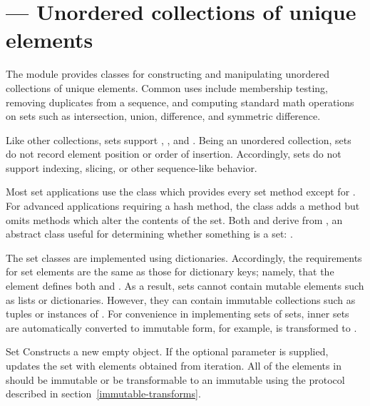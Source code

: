 \section{ ---
         Unordered collections of unique elements}



The  module provides classes for constructing and manipulating
unordered collections of unique elements.  Common uses include membership
testing, removing duplicates from a sequence, and computing standard math
operations on sets such as intersection, union, difference, and symmetric
difference.

Like other collections, sets support ,
, and .  Being an
unordered collection, sets do not record element position or order of
insertion.  Accordingly, sets do not support indexing, slicing, or
other sequence-like behavior.

Most set applications use the  class which provides every set
method except for . For advanced applications requiring
a hash method, the  class adds a 
method but omits methods which alter the contents of the set. Both
 and  derive from , an
abstract class useful for determining whether something is a set:
.

The set classes are implemented using dictionaries.  Accordingly, the
requirements for set elements are the same as those for dictionary keys;
namely, that the element defines both  and .
As a result, sets
cannot contain mutable elements such as lists or dictionaries.
However, they can contain immutable collections such as tuples or
instances of .  For convenience in implementing
sets of sets, inner sets are automatically converted to immutable
form, for example,  is transformed to
.

\begin{classdesc}{Set}{}
Constructs a new empty  object.  If the optional 
parameter is supplied, updates the set with elements obtained from iteration.
All of the elements in  should be immutable or be transformable
to an immutable using the protocol described in
section~\ref{immutable-transforms}.
\end{classdesc}

